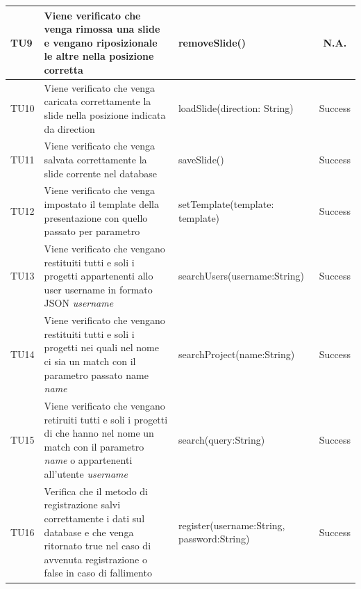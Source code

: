 \begin{table}[H]
\begin{center}
\begin{tabular}{|l|p{}|p{}|c|}
	\midrule
		TU9 & Viene verificato che venga rimossa una slide e vengano riposizionale le altre nella posizione corretta & removeSlide() & N.A.\\
	\midrule
		TU10 & Viene verificato che venga caricata correttamente la slide nella posizione indicata da direction & loadSlide(direction: String) & Success\\
	\midrule
		TU11 & Viene verificato che venga salvata correttamente la slide corrente nel database & saveSlide() & Success\\
		
	\midrule
		TU12 & Viene verificato che venga impostato il template della presentazione con quello passato per parametro & setTemplate(template: template) & Success\\
	\midrule
		TU13 & Viene verificato che vengano restituiti tutti e soli i progetti appartenenti allo user username in formato JSON \textit{username} & searchUsers(username:String) & Success\\
	\midrule
		TU14 & Viene verificato che vengano restituiti tutti e soli i progetti nei quali nel nome ci sia un match con il parametro passato name \textit{name} & searchProject(name:String) & Success\\
		\midrule
		TU15 & Viene verificato che vengano retiruiti tutti e soli i progetti di che hanno nel nome un match con il parametro \textit{name} o appartenenti all'utente \textit{username} & search(query:String) & Success\\
	\midrule
		TU16 & Verifica che il metodo di registrazione salvi correttamente i dati sul database e che venga ritornato true nel caso di avvenuta registrazione o false in caso di fallimento & register(username:String, password:String) & Success\\
	\midrule

\end{tabular}
\end{center}
\end{table}
